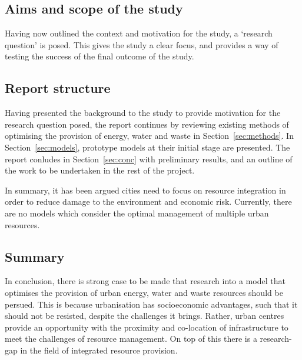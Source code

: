 \subsection{Aims and scope of the study}
Having now outlined the context and motivation for the study, a `research question' is posed. This gives the study a clear focus, and provides a way of testing the success of the final outcome of the study.


\subsection{Report structure}
Having presented the background to the study to provide motivation for the research question posed, the report continues by reviewing existing methods of optimising the provision of energy, water and waste in Section~\ref{sec:methods}. In Section~\ref{sec:models}, prototype models at their initial stage are presented. The report conludes in Section~\ref{sec:conc} with preliminary results, and an outline of the work to be undertaken in the rest of the project.

In summary, it has been argued cities need to focus on resource integration in order to reduce damage to the environment and economic risk. Currently, there are no models which consider the optimal management of multiple urban resources.

\subsection{Summary}
In conclusion, there is strong case to be made that research into a model that optimises the provision of urban energy, water and waste resources should be persued. This is because urbanisation has socioeconomic advantages, such that it should not be resisted, despite the challenges it brings. Rather, urban centres provide an opportunity with the proximity and co-location of infrastructure to meet the challenges of resource management. On top of this there is a research-gap in the field of integrated resource provision.

